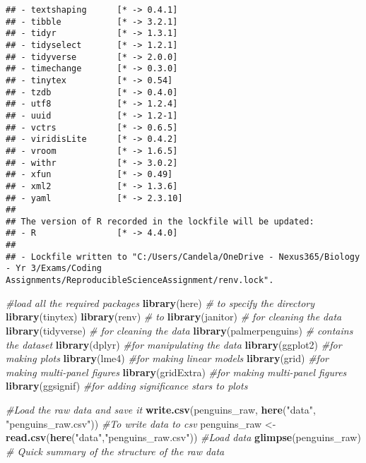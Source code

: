 \documentclass[
]{article}
\newenvironment{Shaded}{\begin{snugshade}}{\end{snugshade}}
\newcommand{\CommentTok}[1]{\textcolor[rgb]{0.56,0.35,0.01}{\textit{#1}}}
\newcommand{\FunctionTok}[1]{\textcolor[rgb]{0.13,0.29,0.53}{\textbf{#1}}}
\newcommand{\NormalTok}[1]{#1}
\newcommand{\OtherTok}[1]{\textcolor[rgb]{0.56,0.35,0.01}{#1}}
\newcommand{\StringTok}[1]{\textcolor[rgb]{0.31,0.60,0.02}{#1}}
\begin{document}
\begin{verbatim}
## - textshaping      [* -> 0.4.1]
## - tibble           [* -> 3.2.1]
## - tidyr            [* -> 1.3.1]
## - tidyselect       [* -> 1.2.1]
## - tidyverse        [* -> 2.0.0]
## - timechange       [* -> 0.3.0]
## - tinytex          [* -> 0.54]
## - tzdb             [* -> 0.4.0]
## - utf8             [* -> 1.2.4]
## - uuid             [* -> 1.2-1]
## - vctrs            [* -> 0.6.5]
## - viridisLite      [* -> 0.4.2]
## - vroom            [* -> 1.6.5]
## - withr            [* -> 3.0.2]
## - xfun             [* -> 0.49]
## - xml2             [* -> 1.3.6]
## - yaml             [* -> 2.3.10]
## 
## The version of R recorded in the lockfile will be updated:
## - R                [* -> 4.4.0]
## 
## - Lockfile written to "C:/Users/Candela/OneDrive - Nexus365/Biology - Yr 3/Exams/Coding Assignments/ReproducibleScienceAssignment/renv.lock".
\end{verbatim}

\begin{Shaded}
\begin{Highlighting}[]
\CommentTok{\#load all the required packages}
\FunctionTok{library}\NormalTok{(here) }\CommentTok{\# to specify the directory}
\FunctionTok{library}\NormalTok{(tinytex)}
\FunctionTok{library}\NormalTok{(renv) }\CommentTok{\# to  }
\FunctionTok{library}\NormalTok{(janitor) }\CommentTok{\# for cleaning the data}
\FunctionTok{library}\NormalTok{(tidyverse) }\CommentTok{\# for cleaning the data}
\FunctionTok{library}\NormalTok{(palmerpenguins) }\CommentTok{\# contains the dataset}
\FunctionTok{library}\NormalTok{(dplyr) }\CommentTok{\#for manipulating the data}
\FunctionTok{library}\NormalTok{(ggplot2) }\CommentTok{\#for making plots}
\FunctionTok{library}\NormalTok{(lme4) }\CommentTok{\#for making linear models}
\FunctionTok{library}\NormalTok{(grid) }\CommentTok{\#for making multi{-}panel figures}
\FunctionTok{library}\NormalTok{(gridExtra) }\CommentTok{\#for making multi{-}panel figures}
\FunctionTok{library}\NormalTok{(ggsignif) }\CommentTok{\#for adding significance stars to plots}
\end{Highlighting}
\end{Shaded}

\begin{Shaded}
\begin{Highlighting}[]
\CommentTok{\#Load the raw data and save it}
\FunctionTok{write.csv}\NormalTok{(penguins\_raw, }\FunctionTok{here}\NormalTok{(}\StringTok{"data"}\NormalTok{, }\StringTok{"penguins\_raw.csv"}\NormalTok{)) }\CommentTok{\#To write data to csv}
\NormalTok{penguins\_raw }\OtherTok{\textless{}{-}} \FunctionTok{read.csv}\NormalTok{(}\FunctionTok{here}\NormalTok{(}\StringTok{"data"}\NormalTok{,}\StringTok{"penguins\_raw.csv"}\NormalTok{)) }\CommentTok{\#Load data }
\FunctionTok{glimpse}\NormalTok{(penguins\_raw) }\CommentTok{\# Quick summary of the structure of the raw data}
\end{Highlighting}
\end{Shaded}
\end{document}
